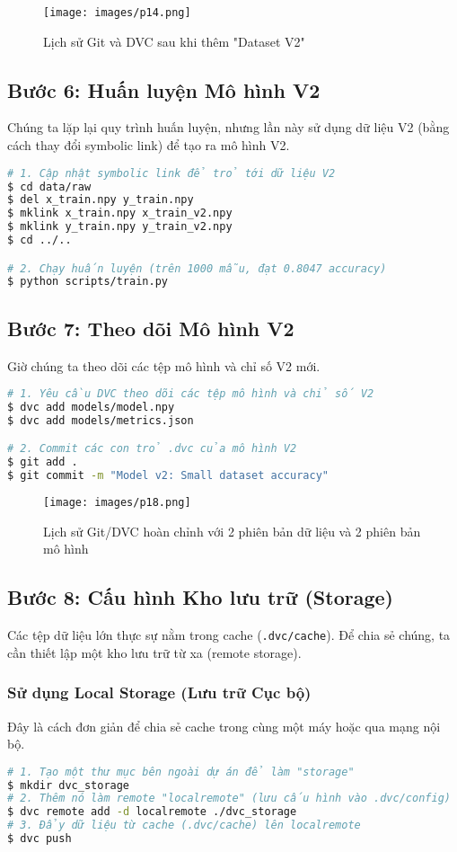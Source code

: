 \documentclass[11pt]{article}
\begin{document}
\begin{figure}[H]
    \centering
    \texttt{[image: images/p14.png]}
    \caption{Lịch sử Git và DVC sau khi thêm "Dataset V2"}
\end{figure}

\subsection{Bước 6: Huấn luyện Mô hình V2}
Chúng ta lặp lại quy trình huấn luyện, nhưng lần này sử dụng dữ liệu V2 (bằng cách thay đổi symbolic link) để tạo ra mô hình V2.

\begin{lstlisting}[language=bash]
# 1. Cập nhật symbolic link để trỏ tới dữ liệu V2
$ cd data/raw
$ del x_train.npy y_train.npy
$ mklink x_train.npy x_train_v2.npy
$ mklink y_train.npy y_train_v2.npy
$ cd ../..

# 2. Chạy huấn luyện (trên 1000 mẫu, đạt 0.8047 accuracy)
$ python scripts/train.py
\end{lstlisting}

\subsection{Bước 7: Theo dõi Mô hình V2}
Giờ chúng ta theo dõi các tệp mô hình và chỉ số V2 mới.

\begin{lstlisting}[language=bash]
# 1. Yêu cầu DVC theo dõi các tệp mô hình và chỉ số V2
$ dvc add models/model.npy
$ dvc add models/metrics.json

# 2. Commit các con trỏ .dvc của mô hình V2
$ git add .
$ git commit -m "Model v2: Small dataset accuracy"
\end{lstlisting}

\begin{figure}[H]
    \centering
    \texttt{[image: images/p18.png]}
    \caption{Lịch sử Git/DVC hoàn chỉnh với 2 phiên bản dữ liệu và 2 phiên bản mô hình}
\end{figure}

\subsection{Bước 8: Cấu hình Kho lưu trữ (Storage)}
Các tệp dữ liệu lớn thực sự nằm trong cache (\texttt{.dvc/cache}). Để chia sẻ chúng, ta cần thiết lập một kho lưu trữ từ xa (remote storage).

\subsubsection{Sử dụng Local Storage (Lưu trữ Cục bộ)}
Đây là cách đơn giản để chia sẻ cache trong cùng một máy hoặc qua mạng nội bộ.
\begin{lstlisting}[language=bash]
# 1. Tạo một thư mục bên ngoài dự án để làm "storage"
$ mkdir dvc_storage
# 2. Thêm nó làm remote "localremote" (lưu cấu hình vào .dvc/config)
$ dvc remote add -d localremote ./dvc_storage
# 3. Đẩy dữ liệu từ cache (.dvc/cache) lên localremote
$ dvc push
\end{lstlisting}
\end{document}
